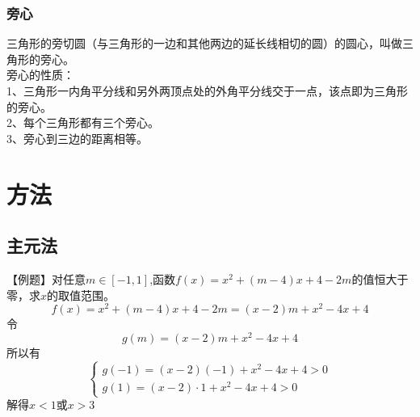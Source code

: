 \documentclass[UTF8]{ctexart}
\begin{document}
			\subsubsection{旁心}
				三角形的旁切圆（与三角形的一边和其他两边的延长线相切的圆）的圆心，叫做三角形的旁心。\\
				旁心的性质：\\
				1、三角形一内角平分线和另外两顶点处的外角平分线交于一点，该点即为三角形的旁心。\\
				2、每个三角形都有三个旁心。\\
				3、旁心到三边的距离相等。\\
	\section{方法}
		\subsection{主元法}
			【例题】对任意$m\in [-1,1]$,函数$f(x)=x^2+(m-4)x+4-2m$的值恒大于零，求$x$的取值范围。\\
			\[f(x)=x^2+(m-4)x+4-2m=(x-2)m+x^2-4x+4\]
			令
			\[g(m)=(x-2)m+x^2-4x+4\]
			所以有
			\[\begin{cases}
				g(-1)=(x-2)(-1)+x^2-4x+4>0
				\\
				g(1)=(x-2)\cdot 1+x^2-4x+4>0
			\end{cases}\]
			解得$x<1 $或$ x>3$
\end{document}

